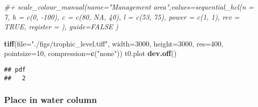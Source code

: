 \documentclass[]{article}
\newenvironment{Shaded}{\begin{snugshade}}{\end{snugshade}}
\newcommand{\KeywordTok}[1]{\textcolor[rgb]{0.13,0.29,0.53}{\textbf{#1}}}
\newcommand{\DataTypeTok}[1]{\textcolor[rgb]{0.13,0.29,0.53}{#1}}
\newcommand{\DecValTok}[1]{\textcolor[rgb]{0.00,0.00,0.81}{#1}}
\newcommand{\StringTok}[1]{\textcolor[rgb]{0.31,0.60,0.02}{#1}}
\newcommand{\CommentTok}[1]{\textcolor[rgb]{0.56,0.35,0.01}{\textit{#1}}}
\newcommand{\NormalTok}[1]{#1}
\begin{document}
\begin{Shaded}
\begin{Highlighting}[]
\CommentTok{#+ scale_colour_manual(name="Management area",values=sequential_hcl(n = 7, h = c(0, -100), c = c(80, NA, 40), l = c(53, 75), power = c(1, 1), rev = TRUE, register = ), guide=FALSE )}


\KeywordTok{tiff}\NormalTok{(}\DataTypeTok{file=}\StringTok{"./figs/trophic_level.tiff"}\NormalTok{, }\DataTypeTok{width=}\DecValTok{3000}\NormalTok{, }\DataTypeTok{height=}\DecValTok{3000}\NormalTok{, }\DataTypeTok{res=}\DecValTok{400}\NormalTok{, }\DataTypeTok{pointsize=}\DecValTok{10}\NormalTok{, }\DataTypeTok{compression=}\KeywordTok{c}\NormalTok{(}\StringTok{"none"}\NormalTok{))}
\NormalTok{t0.plot}
\KeywordTok{dev.off}\NormalTok{()}
\end{Highlighting}
\end{Shaded}

\begin{verbatim}
## pdf 
##   2
\end{verbatim}

\subsubsection{Place in water column}\label{place-in-water-column}
\end{document}
